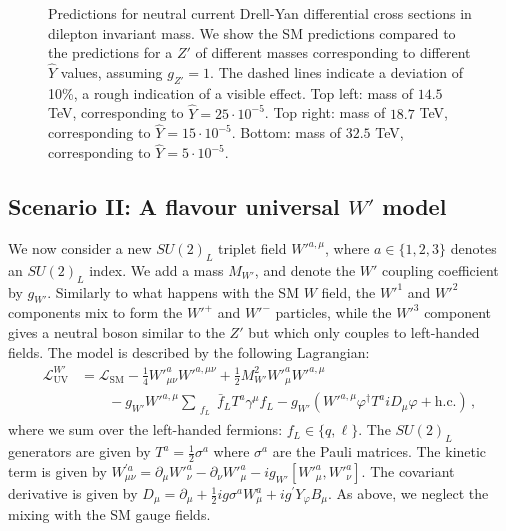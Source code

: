 \documentclass[withindex,glossary]{cam-thesis}
\begin{document}
\begin{figure}[htb]
	\caption{Predictions for neutral current Drell-Yan differential cross sections in dilepton invariant mass.  
    We show the SM predictions compared to the predictions for a $Z'$ of different masses corresponding to different $\hat{Y}$ values, assuming $g_{Z'}=1$. The dashed lines indicate a deviation of 10\%, a rough indication of a visible effect.
    Top left: mass of $14.5$ TeV, corresponding to $\hat{Y}=25 \cdot 10^{-5}$. Top right: mass of $18.7$ TeV, corresponding to $\hat{Y}=15 \cdot 10^{-5}$. 
    Bottom: mass of $32.5$ TeV, corresponding to $\hat{Y}=5 \cdot 10^{-5}$.}
	\label{fig:Zp_DY_Comp}
\end{figure}


\subsection{Scenario II: A flavour universal $W'$ model}
\label{subsec:model-wprime}

We now consider a new $SU(2)_L$ triplet field ${W'}^{a, \mu}$, where $a \in \{1,2,3\}$ denotes an $SU(2)_L$ index. We add a mass $M_{W'}$, and denote the $W'$ coupling coefficient by $g_{W'}$. Similarly to what happens with the SM $W$ field, the $W'^1$ and $W'^2$ components mix to form the $W'^+$ and $W'^-$ particles, while the $W'^3$ component gives a neutral boson similar to the $Z'$ but which only couples to left-handed fields. The 
model is described by the following Lagrangian:
\begin{equation} \label{eq:Wprime}
	\begin{split}
		\mathcal{L}^{W'}_{\text{UV}} &= \mathcal{L}_{\text{SM}} - \frac{1}{4} {W'}^{a}_{\mu \nu} {W'}^{a, \mu \nu} + \frac{1}{2} M_{W'}^{2} {W'}_{\mu}^{a} {W'}^{a, \mu}\\
		&\qquad - g_{W'} {W'}^{a,\mu} \sum_{\substack{f_L}} \bar{f}_L T^{a} \gamma^{\mu} f_L
		 - g_{W'} ({W'}^{a, \mu} \varphi^{\dagger} T^{a} i D_{\mu} \varphi + \textrm{h.c.}) \, ,
	\end{split}
\end{equation}
%
where we sum over the left-handed fermions: $f_L \in \{q, \ell\}$. The $SU(2)_L$ generators are given by $T^a = \frac{1}{2} \sigma ^a$ where $\sigma ^a$ are the Pauli matrices. The kinetic term is given by $W^{'a}_{\mu \nu} = \partial_{\mu} {W'}^{a}_{\nu} - \partial_{\nu} {W'}^{a}_{\mu}- ig_{W'} [{W'}^{a}_{\mu}, {W'}^{a}_{\nu} ]$. The covariant derivative is given by
$D_{\mu} = \partial_{\mu} + \frac{1}{2} ig \sigma^{a} W_{\mu}^{a} + i g^{'} Y_{\varphi} B_{\mu}$.
As above, we neglect the mixing with the SM gauge fields.  
\end{document}
